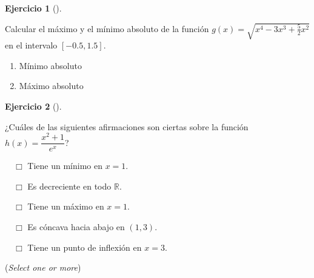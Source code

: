 \documentclass[
  a4paper,
]{scrreport}
\theoremstyle{definition}
\newtheorem{exercise}{Ejercicio}[chapter]
\theoremstyle{remark}
\begin{document}
\begin{exercise}[]\protect\hypertarget{exr-extremos-absolutos}{}\label{exr-extremos-absolutos}

Calcular el máximo y el mínimo absoluto de la función
\(g(x)=\sqrt{x^4-3x^3+\frac{5}{2}x^2}\) en el intervalo \([-0.5,1.5]\).

\begin{enumerate}
\def\labelenumi{\alph{enumi}.}
\item
  Mínimo absoluto

  \vspace{18pt}
\item
  Máximo absoluto

  \vspace{18pt}
\end{enumerate}

\end{exercise}

\begin{exercise}[]\protect\hypertarget{exr-extremos-puntos-inflexion}{}\label{exr-extremos-puntos-inflexion}

¿Cuáles de las siguientes afirmaciones son ciertas sobre la función
\(h(x)=\dfrac{x^2+1}{e^x}\)?

${\quad\Box}$ Tiene un mínimo en $x=1$.

${\quad\Box}$ Es decreciente en todo $\mathbb{R}$.

${\quad\Box}$ Tiene un máximo en $x=1$.

${\quad\Box}$ Es cóncava hacia abajo en $(1,3)$.

${\quad\Box}$ Tiene un punto de inflexión en $x=3$.

(\emph{Select one or more})

\end{exercise}
\end{document}
